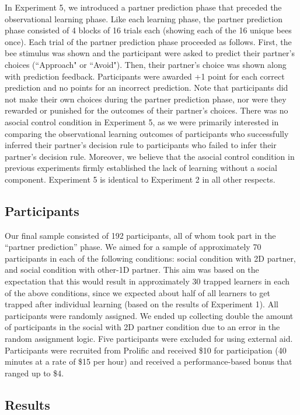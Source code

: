 \documentclass[11pt]{article} %
\begin{document}
In Experiment 5, we introduced a partner prediction phase that preceded the observational learning phase. Like each learning phase, the partner prediction phase consisted of 4 blocks of 16 trials each (showing each of the 16 unique bees once). Each trial of the partner prediction phase proceeded as follows. First, the bee stimulus was shown and the participant were asked to predict their partner's choices (``Approach" or ``Avoid"). Then, their partner's choice was shown along with prediction feedback. Participants were awarded +1 point for each correct prediction and no points for an incorrect prediction. Note that participants did not make their own choices during the partner prediction phase, nor were they rewarded or punished for the outcomes of their partner's choices. There was no asocial control condition in Experiment 5, as we were primarily interested in comparing the observational learning outcomes of participants who successfully inferred their partner's decision rule to participants who failed to infer their partner's decision rule. Moreover, we believe that the asocial control condition in previous experiments firmly established the lack of learning without a social component. Experiment 5 is identical to Experiment 2 in all other respects. 

\subsection{Participants}

Our final sample consisted of 192 participants, all of whom took part in the ``partner prediction'' phase. We aimed for a sample of approximately 70 participants in each of the following conditions: social condition with 2D partner, and social condition with other-1D partner. This aim was based on the expectation that this would result in approximately 30 trapped learners in each of the above conditions, since we expected about half of all learners to get trapped after individual learning (based on the results of Experiment 1). All participants were randomly assigned. We ended up collecting double the amount of participants in the social with 2D partner condition due to an error in the random assignment logic. Five participants were excluded for using external aid. Participants were recruited from Prolific and received \$10 for participation (40 minutes at a rate of \$15 per hour) and received a performance-based bonus that ranged up to \$4.

\subsection{Results}
\end{document}
